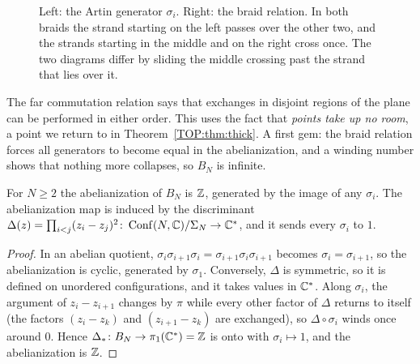\begin{figure}[ht]
\caption{Left: the Artin generator $\sigma_i$. Right: the braid relation. In both braids the strand
starting on the left passes over the other two, and the strands starting in the middle and on the right
cross once. The two diagrams differ by sliding the middle crossing past the strand that lies over it.}
\label{TOP:fig:braid}
\end{figure}

The far commutation relation says that exchanges in disjoint regions of the plane can be performed in
either order. This uses the fact that \emph{points take up no room}, a point we return to in
Theorem~\ref{TOP:thm:thick}. A first gem: the braid relation forces all generators to become equal in
the abelianization, and a winding number shows that nothing more collapses, so $B_N$ is infinite.

\begin{proposition}\label{TOP:prop:abel}
For $N\ge2$ the abelianization of $B_N$ is $\mathbb{Z}$, generated by the image of any $\sigma_i$. The
abelianization map is induced by the discriminant
$\Delta(z)=\prod_{i<j}(z_i-z_j)^2\colon\operatorname{Conf}(N,\mathbb{C})/\Sigma_N\to\mathbb{C}^*$, and it sends every $\sigma_i$ to $1$.
\end{proposition}

\begin{proof}
In an abelian quotient, $\sigma_i\sigma_{i+1}\sigma_i=\sigma_{i+1}\sigma_i\sigma_{i+1}$ becomes
$\sigma_i=\sigma_{i+1}$, so the abelianization is cyclic, generated by $\sigma_1$. Conversely,
$\Delta$ is symmetric, so it is defined on unordered configurations, and it takes values in $\mathbb{C}^*$. Along
$\sigma_i$, the argument of $z_i-z_{i+1}$ changes by $\pi$ while every other factor of $\Delta$ returns to
itself (the factors $(z_i-z_k)$ and $(z_{i+1}-z_k)$ are exchanged), so $\Delta\circ\sigma_i$ winds once around $0$.
Hence $\Delta_*\colon B_N\to\pi_1(\mathbb{C}^*)=\mathbb{Z}$ is onto with $\sigma_i\mapsto1$, and the abelianization is $\mathbb{Z}$.
\end{proof}

